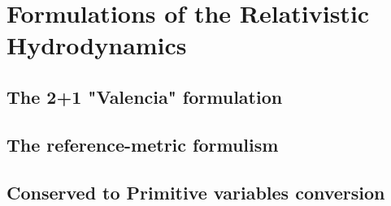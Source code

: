 
\chapter{Formulations of the Relativistic Hydrodynamics}  %

\ifpdf
    \graphicspath{{Chapter2/Figs/PDF/}{Chapter2/Figs/}}
\else
    \graphicspath{{Chapter2/Figs/}}
\fi


\section{The 2+1 "Valencia" formulation} %
\label{section2.1}

\section{The reference-metric formulism} %
\label{section2.2}

\section{Conserved to Primitive variables conversion}  %
\label{section2.3}


